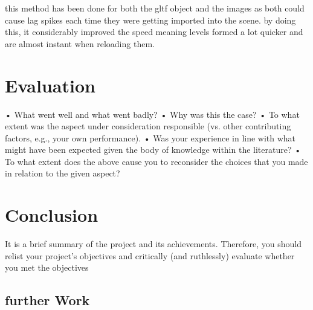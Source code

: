 this method has been done for both the gltf object and the images as both could cause lag spikes each time they were getting imported into the scene. by doing this, it considerably improved the speed meaning levels formed a lot quicker and are almost instant when reloading them. 

\section{Evaluation}
•	What went well and what went badly?  
•	Why was this the case?  
•	To what extent was the aspect under consideration responsible (vs. other contributing factors, e.g., your own performance).
•	Was your experience in line with what might have been expected given the body of knowledge within the literature?
•	To what extent does the above cause you to reconsider the choices that you made in relation to the given aspect?

\section{Conclusion}
It is a brief summary of the project and its achievements. Therefore, you should relist your project’s objectives and critically (and ruthlessly) evaluate whether you met the objectives
\subsection{further Work}

